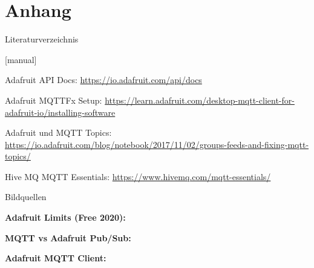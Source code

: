 \section{Anhang}

\begin{frame}{Literaturverzeichnis}
    \begin{thebibliography}{Längste Bezeichnung}
        [manual]
           
           
            \newblock Adafruit API Docs: \url{https://io.adafruit.com/api/docs}
           
            \newblock Adafruit MQTTFx Setup: \url{https://learn.adafruit.com/desktop-mqtt-client-for-adafruit-io/installing-software}
           
            \newblock Adafruit und MQTT Topics: \url{https://io.adafruit.com/blog/notebook/2017/11/02/groups-feeds-and-fixing-mqtt-topics/}
           
            \newblock Hive MQ MQTT Essentials: \url{https://www.hivemq.com/mqtt-essentials/}
                      
    \end{thebibliography}
\end{frame}

{
    \tiny
    \begin{frame}{Bildquellen}
    
          \textbf{Adafruit Limits (Free 2020):} \\
           \medskip
        
           \textbf{MQTT vs Adafruit Pub/Sub:} \\
           \medskip
           
          \textbf{Adafruit MQTT Client:} \\
           \medskip
        
        \end{frame}
}